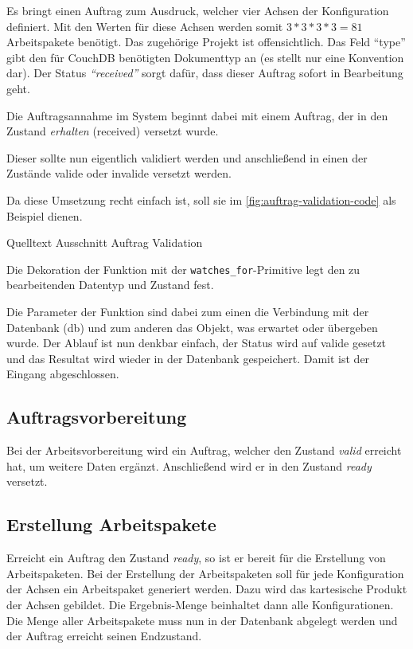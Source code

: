Es bringt einen Auftrag zum Ausdruck, welcher vier Achsen der Konfiguration definiert.
Mit den Werten für diese Achsen werden somit $3*3*3*3 = 81$ Arbeitspakete benötigt.
Das zugehörige Projekt ist offensichtlich. Das Feld ``type'' gibt den für CouchDB benötigten Dokumenttyp an (es stellt nur eine Konvention dar).
Der Status \textit{``received''} sorgt dafür, dass dieser Auftrag sofort in Bearbeitung geht.

\FloatBarrier
Die Auftragsannahme im System beginnt dabei mit einem Auftrag, der in den Zustand \textit{erhalten} (received) versetzt wurde.

Dieser sollte nun eigentlich validiert werden und anschließend in einen der Zustände valide oder invalide versetzt werden.

Da diese Umsetzung recht einfach ist, soll sie im \cref{fig:auftrag-validation-code} als Beispiel dienen.

\begin{listing}[h]
\caption{Quelltext Ausschnitt Auftrag Validation}
\label{fig:auftrag-validation-code}
\end{listing}

Die Dekoration \cite{python:decorator}
der Funktion mit der \verb|watches_for|-Primitive legt den zu bearbeitenden Datentyp und Zustand fest.

Die Parameter der Funktion sind dabei zum einen die Verbindung mit der Datenbank (db) und
zum anderen das Objekt, was erwartet oder übergeben wurde.
Der Ablauf ist nun denkbar einfach, der Status wird auf valide gesetzt und das Resultat wird wieder in der Datenbank gespeichert.
Damit ist der Eingang abgeschlossen.

\FloatBarrier
\subsection{Auftragsvorbereitung}

Bei der Arbeitsvorbereitung wird ein Auftrag,
welcher den Zustand \textit{valid} erreicht hat, um weitere Daten ergänzt.
Anschließend wird er in den Zustand \textit{ready} versetzt.

\subsection{Erstellung Arbeitspakete}

Erreicht ein Auftrag den Zustand \textit{ready}, so ist er bereit für die Erstellung von Arbeitspaketen.
Bei der Erstellung der Arbeitspaketen soll für jede Konfiguration der Achsen ein Arbeitspaket generiert werden.
Dazu wird das kartesische Produkt der Achsen gebildet.
Die Ergebnis-Menge beinhaltet dann alle Konfigurationen.
Die Menge aller Arbeitspakete muss nun in der Datenbank abgelegt werden
und der Auftrag erreicht seinen Endzustand.


